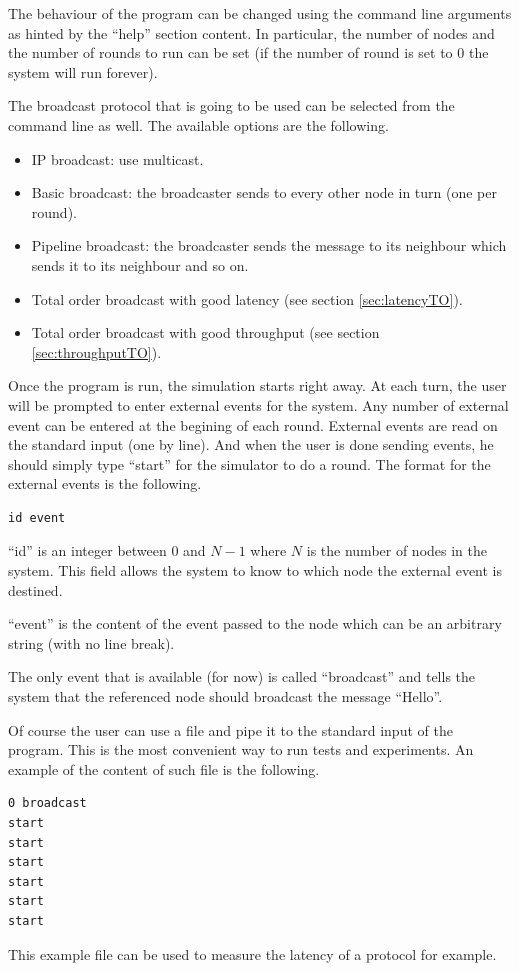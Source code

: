 \documentclass[a4paper]{article}
\begin{document}
The behaviour of the program can be changed using the command line arguments
as hinted by the ``help'' section content. In particular, the number of nodes
and the number of rounds to run can be set (if the number of round is set to
$0$ the system will run forever).

The broadcast protocol that is going to be used can be selected from the
command line as well. The available options are the following.
\begin{itemize}
    \item IP broadcast: use multicast.
    \item Basic broadcast: the broadcaster sends to every other node in turn
        (one per round).
    \item Pipeline broadcast: the broadcaster sends the message to its neighbour
        which sends it to its neighbour and so on.
    \item Total order broadcast with good latency (see section
        \ref{sec:latencyTO}).
    \item Total order broadcast with good throughput (see section
        \ref{sec:throughputTO}).
\end{itemize}

Once the program is run, the simulation starts right away. At each turn, the
user will be prompted to enter external events for the system. Any number of
external event can be entered at the begining of each round. External events
are read on the standard input (one by line). And when the user is done
sending events, he should simply type ``start'' for the simulator to do a
round. The format for the external events is the following.
\begin{lstlisting}
id event
\end{lstlisting}
``id'' is an integer between $0$ and $N-1$ where $N$ is the number of nodes in
the system. This field allows the system to know to which node the external
event is destined.

``event'' is the content of the event passed to the node which can be an
arbitrary string (with no line break).

The only event that is available (for now) is called ``broadcast'' and tells
the system that the referenced node should broadcast the message ``Hello''.

Of course the user can use a file and pipe it to the standard input of the
program. This is the most convenient way to run tests and experiments. An
example of the content of such file is the following.
\begin{verbatim}
0 broadcast
start
start
start
start
start
start
\end{verbatim}
This example file can be used to measure the latency of a protocol for
example.
\end{document}
